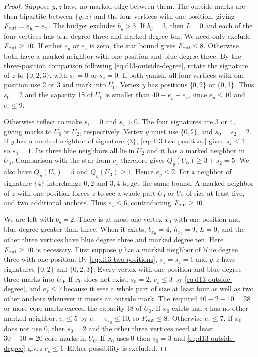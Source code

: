 \documentclass[preprint,11pt,numbers]{elsarticle-arxiv}
\numberwithin{equation}{section}
\theoremstyle{definition}
\begin{document}
\begin{proof}
Suppose $y,z$ have no marked edge between them. The outside marks
are then bipartite between $\{y,z\}$ and the four vertices with one
position, giving $F_{\rm out}=e_y+e_z$. The budget excludes $b_y>3$.
If $b_y=3$, then $L=0$ and each of the four vertices has blue degree
three and marked degree ten. We need only exclude $F_{\rm out}\ge10$.
If either $e_y$ or $e_z$ is zero, the star bound gives
$F_{\rm out}\le8$. Otherwise both have a marked neighbor with one
position and blue degree three. By the three-position comparison
following \eqref{eq:d13-outside-degree}, rotate the signature of $z$
to $\{0,2,3\}$, with $s_1=0$ or $s_4=0$. If both vanish, all four
vertices with one position use 2 or 3 and mark into $U_0$.
Vertex $y$ has positions $\{0,2\}$ or $\{0,3\}$. Thus $s_0=2$
and the capacity 18 of $U_0$ is smaller than $40-e_y-e_z$, since
$e_y\le10$ and $e_z\le9$.

Otherwise reflect to make $s_1=0$ and $s_4>0$. The four signatures
are 3 or 4, giving marks to $U_0$ or $U_2$, respectively. Vertex
$y$ must use $\{0,2\}$, and $s_0=s_2=2$. If $y$ has a marked neighbor
of signature $\{3\}$, \eqref{eq:d13-two-positions} gives $s_4\le1$,
so $s_4=1$. Its three blue neighbors all lie in $U_2$ and it has a
marked neighbor in $U_3$. Comparison with the star from $c_1$
therefore gives $Q_y(U_0)\ge3+s_2=5$. We also have $Q_y(U_2)=5$ and
$Q_y(U_3)\ge1$. Hence $e_y\le2$. For a neighbor of signature
$\{4\}$ interchange $0,2$ and $3,4$ to get the same bound.
A marked neighbor of $z$ with one position forces $z$ to see a
whole part $U_0$ or $U_2$ of size at least five, and two additional
anchors. Thus $e_z\le6$, contradicting $F_{\rm out}\ge10$.

We are left with $b_y=2$. There is at most one vertex $x_0$ with
one position and blue degree greater than three. When it exists,
$b_{x_0}=4$, $h_{x_0}=9$, $L=0$, and the other three vertices have
blue degree three and marked degree ten. Here $F_{\rm out}\ge10$
is necessary. First suppose $y$ has a marked neighbor of blue degree
three with one position. By \eqref{eq:d13-two-positions}, $s_1=s_4=0$
and $y,z$ have
signatures $\{0,2\}$ and $\{0,2,3\}$. Every vertex with one position
and blue degree three marks into $U_0$. If $x_0$ does not exist,
$s_0=2$, $e_y\le3$ by \eqref{eq:d13-outside-degree}, and
$e_z\le7$ because it sees a whole part of size at least four as
well as two other anchors whenever it meets an outside mark.
The required $40-2-10=28$ or more core marks exceed the capacity
18 of $U_0$. If $x_0$ exists and $z$ has no other marked neighbor,
$e_z\le5$ by $e_z+e_{x_0}\le10$, so $F_{\rm out}\le8$.
Otherwise $e_z\le7$. If $x_0$ does not use 0, then $s_0=2$ and
the other three vertices need at least $30-10=20$ core marks in
$U_0$. If $x_0$ uses 0 then $s_0=3$ and
\eqref{eq:d13-outside-degree} gives $e_y\le1$. Either possibility
is excluded.


\end{proof}
\end{document}
